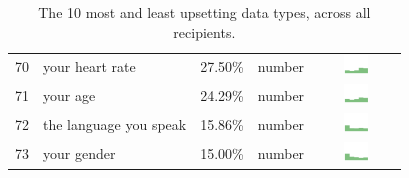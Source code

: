 \begin{table}[t]
\begin{center}
\begin{tabular}{| r | l | r | l |c |}
70 & your heart rate & 27.50\% & number & \includegraphics[width = 2cm, height = 0.5cm]{tex-inputs/data10/learnedyourheartratecombined} \\
71 & your age & 24.29\% & number & \includegraphics[width = 2cm, height = 0.5cm]{tex-inputs/data10/learnedyouragecombined}\\
72 & the language you speak & 15.86\% & number & \includegraphics[width = 2cm, height = 0.5cm]{tex-inputs/data10/learnedthelanguageyouwerespeakingcombined}\\
73 & your gender & 15.00\% & number & \includegraphics[width = 2cm, height = 0.5cm]{tex-inputs/data10/learnedyourgendercombined}\\ 
\hline
\end{tabular}
\caption{The 10 most and least upsetting data types, across all recipients.}
\label{top10-table}
\end{center}
\end{table}












